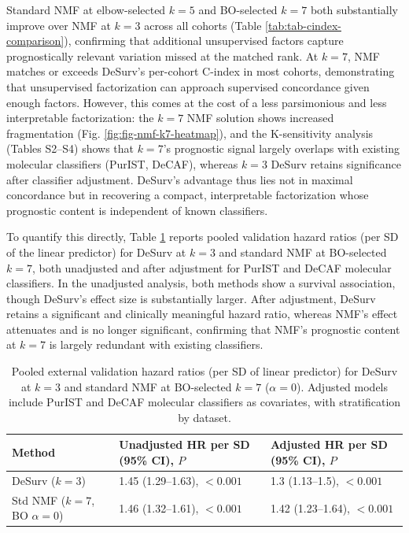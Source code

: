 \documentclass[
]{article}
\begin{document}
Standard NMF at elbow-selected \(k = 5\) and BO-selected \(k = 7\) both
substantially improve over NMF at \(k = 3\) across all cohorts (Table
\ref{tab:tab-cindex-comparison}), confirming that additional
unsupervised factors capture prognostically relevant variation missed at
the matched rank. At \(k = 7\), NMF matches or exceeds DeSurv's
per-cohort C-index in most cohorts, demonstrating that unsupervised
factorization can approach supervised concordance given enough factors.
However, this comes at the cost of a less parsimonious and less
interpretable factorization: the \(k = 7\) NMF solution shows increased
fragmentation (Fig. \ref{fig:fig-nmf-k7-heatmap}), and the K-sensitivity
analysis (Tables S2--S4) shows that \(k = 7\)'s prognostic signal
largely overlaps with existing molecular classifiers (PurIST, DeCAF),
whereas \(k = 3\) DeSurv retains significance after classifier
adjustment. DeSurv's advantage thus lies not in maximal concordance but
in recovering a compact, interpretable factorization whose prognostic
content is independent of known classifiers.

To quantify this directly, Table \ref{tab:tab-hr-adjusted} reports
pooled validation hazard ratios (per SD of the linear predictor) for
DeSurv at \(k = 3\) and standard NMF at BO-selected \(k = 7\), both
unadjusted and after adjustment for PurIST and DeCAF molecular
classifiers. In the unadjusted analysis, both methods show a survival
association, though DeSurv's effect size is substantially larger. After
adjustment, DeSurv retains a significant and clinically meaningful
hazard ratio, whereas NMF's effect attenuates and is no longer
significant, confirming that NMF's prognostic content at \(k = 7\) is
largely redundant with existing classifiers.

\begin{table}[!h]
\centering
\caption{\label{tab:tab-hr-adjusted}Pooled external validation hazard ratios (per SD of linear predictor) for DeSurv at $k = 3$ and standard NMF at BO-selected $k = 7$ ($\alpha = 0$). Adjusted models include PurIST and DeCAF molecular classifiers as covariates, with stratification by dataset. \label{tab:tab-hr-adjusted}}
\centering
\fontsize{9}{11}\selectfont
\begin{tabular}[t]{lll}
\toprule
Method & Unadjusted HR per SD (95\% CI), $P$ & Adjusted HR per SD (95\% CI), $P$\\
\midrule
DeSurv ($k = 3$) & 1.45 (1.29--1.63), $< 0.001$ & 1.3 (1.13--1.5), $< 0.001$\\
Std NMF ($k = 7$, BO $\alpha = 0$) & 1.46 (1.32--1.61), $< 0.001$ & 1.42 (1.23--1.64), $< 0.001$\\
\bottomrule
\end{tabular}
\end{table}
\end{document}
